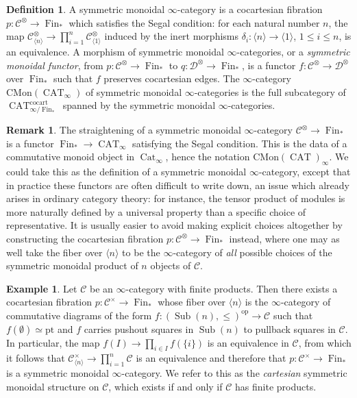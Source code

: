 \documentclass[12pt]{article}
\theoremstyle{definition}
\newtheorem{definition}{Definition}[subsection]
\newtheorem{example}{Example}[subsection]
\newtheorem{remark}{Remark}[subsection]
\newcommand{\C}{\mathcal{C}}
\newcommand{\D}{\mathcal{D}}
\renewcommand{\i}{\infty}
\newcommand{\op}{\mathrm{op}}
\newcommand{\n}{\langle n\rangle}
\DeclareMathOperator{\Sub}{Sub}
\DeclareMathOperator{\cocart}{cocart}
\DeclareMathOperator{\Cat}{Cat}
\DeclareMathOperator{\CAT}{CAT}
\DeclareMathOperator{\Fin}{Fin}
\newcommand{\pt}{\mathrm{pt}}
\newcommand{\CMon}{\mathrm{CMon}}
\begin{document}
\begin{definition}
A symmetric monoidal $\infty$-category
is a cocartesian fibration $p:\C^\otimes\to\Fin_*$ which satisfies the Segal condition: for each natural number $n$, the map $\C^\otimes_{\n}\to\prod_{i=1}^n\C^\otimes_{\langle 1\rangle}$ induced by the inert morphisms $\delta_i:\n\to\langle 1\rangle$, $1\leq i\leq n$, is an equivalence.
A morphism of symmetric monoidal $\i$-categories, or a {\em symmetric monoidal functor}, from $p:\C^\otimes\to\Fin_*$ to $q:\D^\otimes\to\Fin_*$, is a functor $f:\C^\otimes\to\D^\otimes$ over $\Fin_*$ such that $f$ preserves cocartesian edges.
The $\i$-category $\CMon(\CAT_\i)$\index{$\CMon(\CAT_\i)$} of symmetric monoidal $\i$-categories is the full subcategory of $\CAT_{\i/\Fin_*}^{\cocart}$ spanned by the symmetric monoidal $\i$-categories.
\end{definition}
\begin{remark}
The straightening of a symmetric monoidal $\i$-category $\C^\otimes\to\Fin_*$ is a functor $\Fin_*\to\CAT_\i$ satisfying the Segal condition.
This is the data of a commutative monoid object in $\Cat_\i$, hence the notation $\CMon(\CAT)_\i$.
We could take this as the definition of a symmetric monoidal $\infty$-category, except that in practice these functors are often difficult to write down,
an issue which already arises in ordinary category theory: for instance, the tensor product of modules is more naturally defined by a universal property than a specific choice of representative.
It is usually easier to avoid making explicit choices altogether by constructing the cocartesian fibration $p:\C^\otimes\to\Fin_*$ instead, where one may as well take the fiber over $\langle n\rangle$ to be the $\infty$-category of {\em all} possible choices of the symmetric monoidal product of $n$ objects of $\C$.
\end{remark}
\begin{example}
Let $\C$ be an $\infty$-category with finite products.
Then there exists a cocartesian fibration $p:\C^\times\to\Fin_*$ whose fiber over $\n$ is the $\infty$-category of commutative diagrams of the form $f:(\Sub(n),\leq)^{\op}\to\C$ such that $f(\emptyset)\simeq\pt$ and $f$ carries pushout squares in $\Sub(n)$ to pullback squares in $\C$.
In particular, the map $f(I)\to\prod_{i\in I} f(\{i\})$ is an equivalence in $\C$, from which it follows that $\C^\times_{\n}\to\prod_{i=1}^n\C$ is an equivalence and therefore that $p:\C^\times\to\Fin_*$ is a symmetric monoidal $\infty$-category.
We refer to this as the {\em cartesian} symmetric monoidal structure
on $\C$, which exists if and only if $\C$ has finite products.
\end{example}
\end{document}

